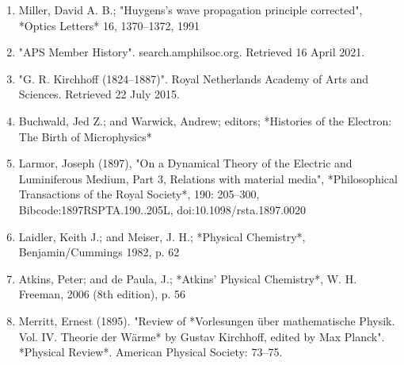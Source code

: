 \begin{enumerate}
\item Miller, David A. B.; "Huygens's wave propagation principle corrected", *Optics Letters* 16, 1370–1372, 1991  
\item "APS Member History". search.amphilsoc.org. Retrieved 16 April 2021.  
\item "G. R. Kirchhoff (1824–1887)". Royal Netherlands Academy of Arts and Sciences. Retrieved 22 July 2015.  
\item Buchwald, Jed Z.; and Warwick, Andrew; editors; *Histories of the Electron: The Birth of Microphysics*  
\item Larmor, Joseph (1897), "On a Dynamical Theory of the Electric and Luminiferous Medium, Part 3, Relations with material media", *Philosophical Transactions of the Royal Society*, 190: 205–300, Bibcode:1897RSPTA.190..205L, doi:10.1098/rsta.1897.0020  
\item Laidler, Keith J.; and Meiser, J. H.; *Physical Chemistry*, Benjamin/Cummings 1982, p. 62  
\item Atkins, Peter; and de Paula, J.; *Atkins' Physical Chemistry*, W. H. Freeman, 2006 (8th edition), p. 56  
\item Merritt, Ernest (1895). "Review of *Vorlesungen über mathematische Physik. Vol. IV. Theorie der Wärme* by Gustav Kirchhoff, edited by Max Planck". *Physical Review*. American Physical Society: 73–75.
\end{enumerate}